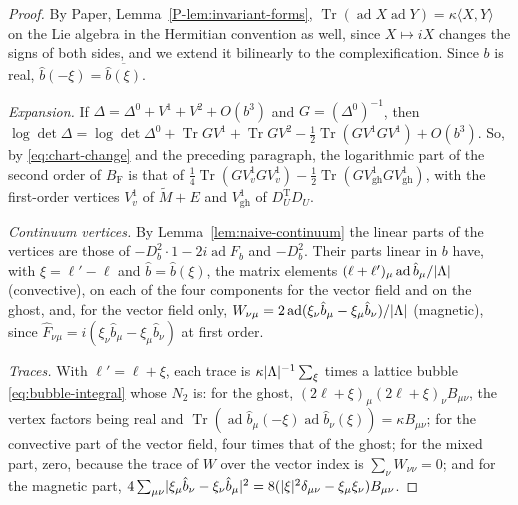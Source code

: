 \documentclass[11pt]{preprint}
\DeclarePairedDelimiter{\abs}{\lvert}{\rvert}
\numberwithin{equation}{section}
\theoremstyle{definition}
\theoremstyle{remark}
\theoremstyle{plain}
\begin{document}
\begin{proof}
By Paper, Lemma~\ref{P-lem:invariant-forms}, $\operatorname{Tr}(\operatorname{ad}X\operatorname{ad}Y) = \kappa\langle X, Y\rangle$ on the Lie algebra in the Hermitian convention as well, since $X \mapsto iX$ changes the signs of both sides, and we extend it bilinearly to the complexification. Since $b$ is real, $\hat b(-\xi) = \overline{\hat b(\xi)}$.

\emph{Expansion.} If $\Delta = \Delta^0 + V^1 + V^2 + O(b^3)$ and $G = (\Delta^0)^{-1}$, then $\log\det\Delta = \log\det\Delta^0 + \operatorname{Tr}GV^1 + \operatorname{Tr}GV^2 - \frac12\operatorname{Tr}(GV^1GV^1) + O(b^3)$. So, by \eqref{eq:chart-change} and the preceding paragraph, the logarithmic part of the second order of $B_{\mathrm F}$ is that of $\frac14\operatorname{Tr}(GV^1_vGV^1_v) - \frac12\operatorname{Tr}(GV^1_{\mathrm{gh}}GV^1_{\mathrm{gh}})$, with the first-order vertices $V^1_v$ of $\tilde M + E$ and $V^1_{\mathrm{gh}}$ of $D_U^{\mathrm T}D_U$.

\emph{Continuum vertices.} By Lemma~\ref{lem:naive-continuum} the linear parts of the vertices are those of $-D_b^2\cdot 1 - 2i\operatorname{ad}F_b$ and $-D_b^2$. Their parts linear in $b$ have, with $\xi = \ell' - \ell$ and $\hat b = \hat b(\xi)$, the matrix elements $(\ell + \ell')_\mu\operatorname{ad}\hat b_\mu/\abs{\Lambda}$ (convective), on each of the four components for the vector field and on the ghost, and, for the vector field only, $W_{\nu\mu} = 2\operatorname{ad}(\xi_\nu\hat b_\mu - \xi_\mu\hat b_\nu)/\abs{\Lambda}$ (magnetic), since $\hat F_{\nu\mu} = i(\xi_\nu\hat b_\mu - \xi_\mu\hat b_\nu)$ at first order.

\emph{Traces.} With $\ell' = \ell + \xi$, each trace is $\kappa\abs{\Lambda}^{-1}\sum_\xi$ times a lattice bubble \eqref{eq:bubble-integral} whose $N_2$ is: for the ghost, $(2\ell + \xi)_\mu(2\ell + \xi)_\nu B_{\mu\nu}$, the vertex factors being real and $\operatorname{Tr}(\operatorname{ad}\hat b_\mu(-\xi)\operatorname{ad}\hat b_\nu(\xi)) = \kappa B_{\mu\nu}$; for the convective part of the vector field, four times that of the ghost; for the mixed part, zero, because the trace of $W$ over the vector index is $\sum_\nu W_{\nu\nu} = 0$; and for the magnetic part, $4\sum_{\mu\nu}\abs{\xi_\mu\hat b_\nu - \xi_\nu\hat b_\mu}^2 = 8(\abs{\xi}^2\delta_{\mu\nu} - \xi_\mu\xi_\nu)B_{\mu\nu}$.


\end{proof}
\end{document}
